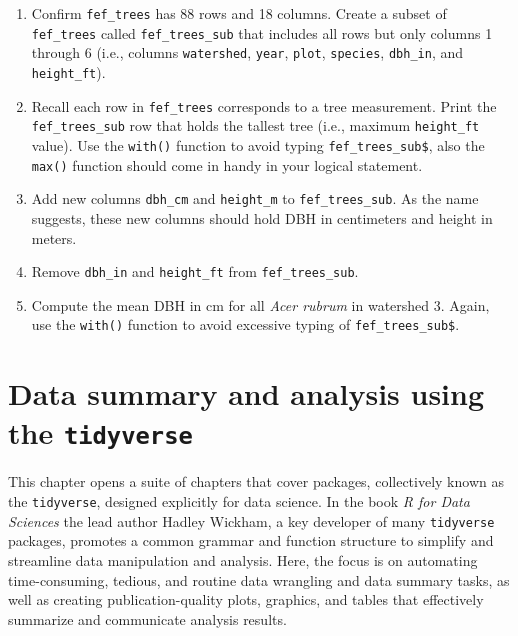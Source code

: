 \documentclass[
  11pt,
]{krantz}
\theoremstyle{definition}
\theoremstyle{definition}
\theoremstyle{definition}
\theoremstyle{definition}
\theoremstyle{remark}
\begin{document}
\begin{enumerate}
\def\labelenumi{\alph{enumi}.}
\item
  Confirm \texttt{fef\_trees} has 88 rows and 18 columns. Create a subset of \texttt{fef\_trees} called \texttt{fef\_trees\_sub} that includes all rows but only columns 1 through 6 (i.e., columns \texttt{watershed}, \texttt{year}, \texttt{plot}, \texttt{species}, \texttt{dbh\_in}, and \texttt{height\_ft}).
\item
  Recall each row in \texttt{fef\_trees} corresponds to a tree measurement. Print the \texttt{fef\_trees\_sub} row that holds the tallest tree (i.e., maximum \texttt{height\_ft} value). Use the \texttt{with()} function to avoid typing \texttt{fef\_trees\_sub\$}, also the \texttt{max()} function should come in handy in your logical statement.
\item
  Add new columns \texttt{dbh\_cm} and \texttt{height\_m} to \texttt{fef\_trees\_sub}. As the name suggests, these new columns should hold DBH in centimeters and height in meters.
\item
  Remove \texttt{dbh\_in} and \texttt{height\_ft} from \texttt{fef\_trees\_sub}.
\item
  Compute the mean DBH in cm for all \emph{Acer rubrum} in watershed 3. Again, use the \texttt{with()} function to avoid excessive typing of \texttt{fef\_trees\_sub\$}.
\end{enumerate}

\hypertarget{tidyverse}{%
\chapter{\texorpdfstring{Data summary and analysis using the \texttt{tidyverse}}{Data summary and analysis using the tidyverse}}\label{tidyverse}}

This chapter opens a suite of chapters that cover packages, collectively known as the \texttt{tidyverse}, designed explicitly for data science. In the book \emph{R for Data Sciences} \citep{wickham2023} the lead author Hadley Wickham, a key developer of many \texttt{tidyverse} packages, promotes a common grammar and function structure to simplify and streamline data manipulation and analysis. Here, the focus is on automating time-consuming, tedious, and routine data wrangling and data summary tasks, as well as creating publication-quality plots, graphics, and tables that effectively summarize and communicate analysis results.
\end{document}
